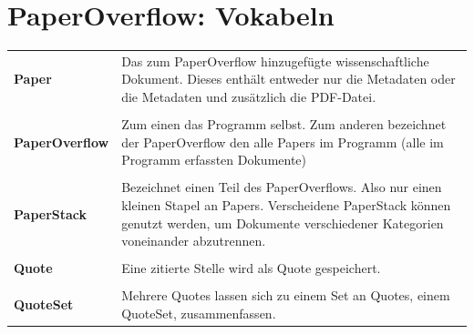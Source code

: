 \documentclass[a4paper,12pt]{article}
\begin{document}
\pagebreak
\section{PaperOverflow: Vokabeln}
\begin{tabular}{ p{5cm} p{8.5cm} }
  \textbf{Paper} & Das zum PaperOverflow hinzugefügte wissenschaftliche Dokument. Dieses enthält entweder nur die Metadaten oder die Metadaten und zusätzlich die PDF-Datei. \\ \\
  \textbf{PaperOverflow} & Zum einen das Programm selbst. Zum anderen bezeichnet der PaperOverflow den alle Papers im Programm (alle im Programm erfassten Dokumente) \\ \\
  \textbf{PaperStack} & Bezeichnet einen Teil des PaperOverflows. Also nur einen kleinen Stapel an Papers. Verscheidene PaperStack können genutzt werden, um Dokumente verschiedener Kategorien voneinander abzutrennen.\\ \\
  \textbf{Quote} & Eine zitierte Stelle wird als Quote gespeichert.\\ \\
  \textbf{QuoteSet} & Mehrere Quotes lassen sich zu einem Set an Quotes, einem QuoteSet, zusammenfassen.\\
\end{tabular}
\end{document}

